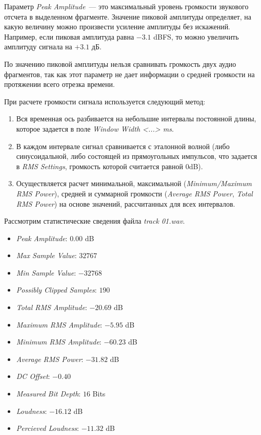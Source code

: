 \documentclass[oneside, final, 14pt]{extreport}
\begin{document}
Параметр \textit{Peak Amplitude}~--- это максимальный уровень громкости звукового отсчета в выделенном фрагменте. Значение пиковой амплитуды определяет, на какую величину можно произвести усиление амплитуды без искажений. Например, если пиковая амплитуда равна $-3.1$ dBFS, то можно увеличить амплитуду сигнала на $+3.1$ дБ.

По значению пиковой амплитуды нельзя сравнивать громкость
двух аудио фрагментов, так как этот параметр не дает информации о
средней громкости на протяжении всего отрезка времени.

При расчете громкости сигнала используется следующий метод:
\begin{enumerate}
\item Вся временная ось разбивается на небольшие интервалы постоянной длины, которое задается в поле \textit{Window Width <...> ms}.
\item В каждом интервале сигнал сравнивается с эталонной волной (либо синусоидальной, либо состоящей из прямоугольных импульсов, что задается в \textit{RMS Settings}, громкость которой считается равной 0dB).
\item Осуществляется расчет минимальной, максимальной (\textit{Minimum/Maximum RMS Power}), средней и суммарной громкости (\textit{Average RMS Power}, \textit{Total RMS Power}) на основе значений, рассчитанных для всех интервалов.
\end{enumerate}

Рассмотрим статистические сведения файла \textit{track 01.wav}.
\begin{itemize}
\item \textit{Peak Amplitude}: $0.00$  dB
\item \textit{Max Sample Value}: $ 32 767$
\item \textit{Min Sample Value}: $-32 768$
\item \textit{Possibly Clipped Samples}:	$190$
\item \textit{Total RMS Amplitude}: $-20.69$ dB
\item \textit{Maximum RMS Amplitude}: $-5.95$ dB
\item \textit{Minimum RMS Amplitude}: $-60.23$ dB
\item \textit{Average RMS  Power}: $-31.82$ dB
\item \textit{DC Offset}: $-0.40$
\item \textit{Measured Bit Depth}: $16$ Bits
\item \textit{Loudness}: $-16.12$ dB
\item \textit{Percieved Loudness}: $-11.32$ dB
\end{itemize}
\end{document}
